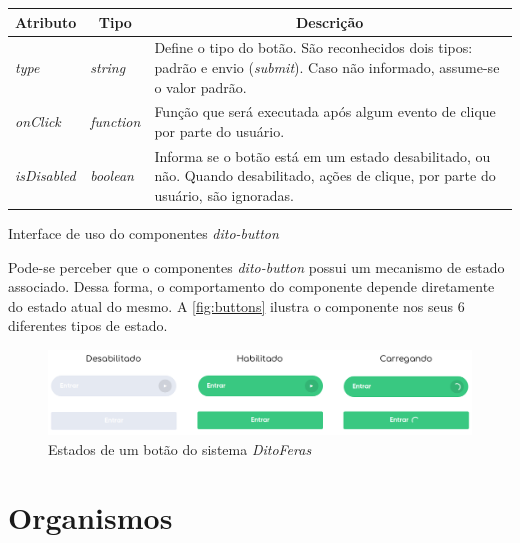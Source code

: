 \begin{quadro}
\centering
\begin{tabular}{|m{4cm}|m{3cm}|m{7cm}|} \hline
	
	\multicolumn{1}{|c|}{\bfseries Atributo} & \multicolumn{1}{c|}{\bfseries Tipo} & \multicolumn{1}{c|}{\bfseries Descrição} \\\hline
	
	 \textit{type} & \textit{string} & Define o tipo do botão. São reconhecidos dois tipos: padrão e envio (\textit{submit}). Caso não informado, assume-se o valor padrão. \\\hline
	 \textit{onClick} & \textit{function} & Função que será executada após algum evento de clique por parte do usuário. \\\hline
	 \textit{isDisabled} & \textit{boolean} & Informa se o botão está em um estado desabilitado, ou não. Quando desabilitado, ações de clique, por parte do usuário, são ignoradas. \\\hline
    
\end{tabular}
\caption{Interface de uso do componentes \textit{dito-button}}
\label{table:ditoButton}
\end{quadro}

Pode-se perceber que o componentes \textit{dito-button} possui um mecanismo de estado associado. Dessa forma, o comportamento do componente depende diretamente do estado atual do mesmo. A \autoref{fig:buttons} ilustra o componente nos seus 6 diferentes tipos de estado.

\begin{figure}
  \begin{center}
	  \includegraphics[width=\linewidth]{./04-figuras/06_biblioteca_componentes/buttons.png}
	\end{center}
  \caption{Estados de um botão do sistema \textit{DitoFeras}}
  \label{fig:buttons}
\end{figure}

\section{Organismos}

